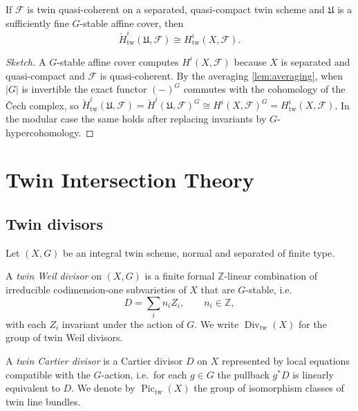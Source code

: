 \documentclass[11pt,a4paper]{article}
\numberwithin{equation}{section}
\newcommand{\Z}{\mathbb{Z}}
\DeclareMathOperator{\Pic}{Pic}
\DeclareMathOperator{\Divv}{Div}
\newcommand{\TwinScheme}{(X,G)}
\newcommand{\Fcal}{\mathcal{F}}
\newcommand{\abs}[1]{\left\lvert #1 \right\rvert}
\begin{document}
	\begin{theorem}[Comparison]
		If $\Fcal$ is twin quasi-coherent on a separated, quasi-compact twin scheme and $\mathfrak{U}$ is a 
		sufficiently fine $G$-stable affine cover, then
		\[
		\check{H}^i_{\mathrm{tw}}(\mathfrak{U},\Fcal) \cong H^i_{\mathrm{tw}}(X,\Fcal).
		\]
	\end{theorem}
	
	\begin{proof}[Sketch]
		A $G$-stable affine cover computes $H^i(X,\Fcal)$ because $X$ is separated and quasi-compact and $\Fcal$ is
		quasi-coherent. By the averaging \cref{lem:averaging}, when $\abs G$ is invertible the exact functor $(-)^G$
		commutes with the cohomology of the \v{C}ech complex, so
		$\check H^i_{\mathrm{tw}}(\mathfrak U,\Fcal)=\check H^i(\mathfrak U,\Fcal)^G\cong H^i(X,\Fcal)^G=H^i_{\mathrm{tw}}(X,\Fcal)$.
		In the modular case the same holds after replacing invariants by $G$-hypercohomology.
	\end{proof}
	
	\section{Twin Intersection Theory}
	\label{sec:intersection}
	
	\subsection{Twin divisors}
	
	Let $\TwinScheme$ be an integral twin scheme, normal and separated of finite type.
	
	\begin{definition}
		A \emph{twin Weil divisor} on $\TwinScheme$ is a finite formal $\Z$-linear combination of 
		irreducible codimension-one subvarieties of $X$ that are $G$-stable, i.e.
		\[
		D = \sum_i n_i Z_i,\qquad n_i\in\Z,
		\]
		with each $Z_i$ invariant under the action of $G$.
		We write $\Divv_{\mathrm{tw}}(X)$ for the group of twin Weil divisors.
	\end{definition}
	
	\begin{definition}
		A \emph{twin Cartier divisor} is a Cartier divisor $D$ on $X$ represented by local equations
		compatible with the $G$-action, i.e.\ for each $g\in G$ the pullback $g^\ast D$ is linearly equivalent to $D$.
		We denote by $\Pic_{\mathrm{tw}}(X)$ the group of isomorphism classes of twin line bundles.
	\end{definition}
	
\end{document}
